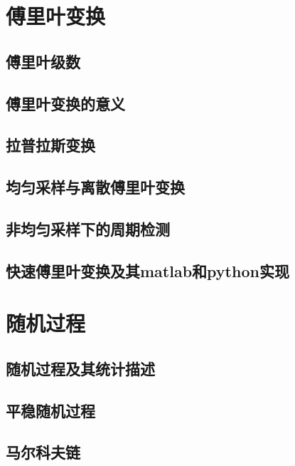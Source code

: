 \chapter{傅里叶变换}
\section{傅里叶级数}

\section{傅里叶变换的意义}

\section{拉普拉斯变换}

\section{均匀采样与离散傅里叶变换}

\section{非均匀采样下的周期检测}

\section{快速傅里叶变换及其matlab和python实现}


\chapter{随机过程}
\section{随机过程及其统计描述}

\section{平稳随机过程}

\section{马尔科夫链}

